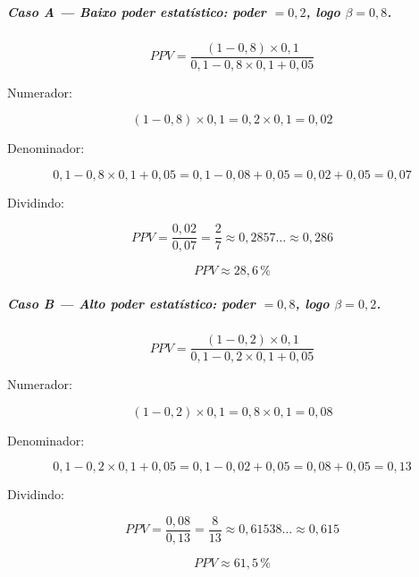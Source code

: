 \begin{metodo}
\subparagraph{Caso A — Baixo poder estatístico: poder $= 0{,}2$, logo $\beta = 0{,}8$.}

\[
PPV = \frac{(1-0{,}8) \times 0{,}1}{0{,}1 - 0{,}8 \times 0{,}1 + 0{,}05}
\]

Numerador:

\[
(1-0{,}8) \times 0{,}1 = 0{,}2 \times 0{,}1 = 0{,}02
\]

Denominador:

\[
0{,}1 - 0{,}8 \times 0{,}1 + 0{,}05 = 0{,}1 - 0{,}08 + 0{,}05 = 0{,}02 + 0{,}05 = 0{,}07
\]

Dividindo:

\[
PPV = \frac{0{,}02}{0{,}07} = \frac{2}{7} \approx 0{,}2857\ldots \approx 0{,}286
\]

\[
\boxed{PPV \approx 28{,}6\,\%}
\]

\subparagraph{Caso B — Alto poder estatístico: poder $= 0{,}8$, logo $\beta = 0{,}2$.}

\[
PPV = \frac{(1-0{,}2) \times 0{,}1}{0{,}1 - 0{,}2 \times 0{,}1 + 0{,}05}
\]

Numerador:

\[
(1-0{,}2) \times 0{,}1 = 0{,}8 \times 0{,}1 = 0{,}08
\]

Denominador:

\[
0{,}1 - 0{,}2 \times 0{,}1 + 0{,}05 = 0{,}1 - 0{,}02 + 0{,}05 = 0{,}08 + 0{,}05 = 0{,}13
\]

Dividindo:

\[
PPV = \frac{0{,}08}{0{,}13} = \frac{8}{13} \approx 0{,}61538\ldots \approx 0{,}615
\]

\[
\boxed{PPV \approx 61{,}5\,\%}
\]
\end{metodo}

